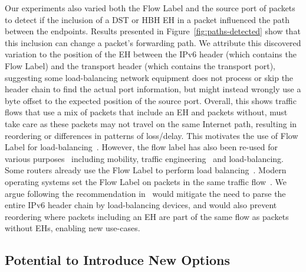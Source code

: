 \documentclass[conference]{IEEEtran}
\begin{document}

Our experiments also varied both the Flow Label and the source port of packets to detect if the inclusion of a DST or HBH EH in a packet influenced the path between the endpoints. Results presented in Figure~\ref{fig:paths-detected} show that this inclusion can change a packet's forwarding path. We attribute this discovered variation to the position of the EH between the IPv6 header (which contains the Flow Label) and the transport header (which contains the transport port), suggesting some load-balancing network equipment does not process or skip the header chain to find the actual port information, but might instead wrongly use a byte offset to the expected position of the source port. Overall, this shows traffic flows that use a mix of packets that include an EH and packets without, must take care as these packets may not travel on the same Internet path, resulting in reordering or differences in patterns of loss/delay. 
This motivates the use of Flow Label for load-balancing~\cite{RFC6437}. However,  the flow label has also been re-used for various purposes~\cite{flow-label-approaches} including mobility, traffic engineering~\cite{traffic-eng} and load-balancing. Some routers already use the Flow Label to perform load balancing~\cite{lb-classification}. Modern operating systems set the Flow Label on packets in the same traffic flow~\cite{os-fl}. We argue following the recommendation in~\cite{RFC6437} would mitigate the need to parse the entire IPv6 header chain by load-balancing devices, and would also prevent reordering where packets including an EH are part of the same flow as packets without EHs, enabling new use-cases. 




\subsection{Potential to Introduce New Options}
\end{document}
